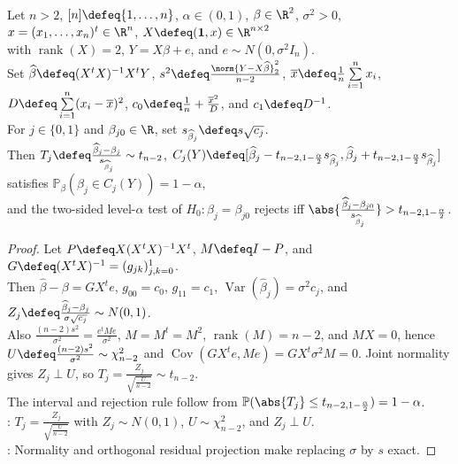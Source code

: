 \begin{corollary} \label{cor:simple-regression-t-intervals} \\
Let $n>2$, $[n]\defeq\{1,\ldots,n\}$, $\alpha\in(0,1)$, $\beta\in\R^2$, $\sigma^2>0$, $x=(x_1,\ldots,x_n)^t\in\R^n$, $X\defeq(\mathbf{1},x)\in\R^{n\times2}$\\
with $\operatorname{rank}(X)=2$, $Y=X\beta+e$, and $e\sim N(0,\sigma^2I_n)$.\\
Set $\widehat{\beta}\defeq(X^tX)^{-1}X^tY$, $s^2\defeq\frac{\norm{Y-X\widehat{\beta}}_2^2}{n-2}$, $\overline{x}\defeq \frac{1}{n}\sum\limits_{i=1}^{n}x_i$, $D\defeq\sum\limits_{i=1}^{n}(x_i-\overline{x})^2$, $c_0\defeq \frac{1}{n}+\frac{\overline{x}^2}{D}$, and $c_1\defeq D^{-1}$.\\
For $j\in\{0,1\}$ and $\beta_{j0}\in\R$, set $s_{\widehat{\beta}_j}\defeq s\sqrt{c_j}$.\\
Then $T_j\defeq\frac{\widehat{\beta}_j-\beta_j}{s_{\widehat{\beta}_j}}\sim t_{n-2}$, $C_j(Y)\defeq[\widehat{\beta}_j-t_{n-2,1-\frac{\alpha}{2}}s_{\widehat{\beta}_j},\widehat{\beta}_j+t_{n-2,1-\frac{\alpha}{2}}s_{\widehat{\beta}_j}]$ satisfies $\mathbb{P}_\beta(\beta_j\in C_j(Y))=1-\alpha$,\\
and the two-sided level-$\alpha$ test of $H_0:\beta_j=\beta_{j0}$ rejects iff $\abs{\frac{\widehat{\beta}_j-\beta_{j0}}{s_{\widehat{\beta}_j}}}>t_{n-2,1-\frac{\alpha}{2}}$.
\begin{proof} Let $P\defeq X(X^tX)^{-1}X^t$, $M\defeq I-P$, and $G\defeq(X^tX)^{-1}=(g_{jk})_{j,k=0}^{1}$.\\
Then $\widehat{\beta}-\beta=GX^te$, $g_{00}=c_0$, $g_{11}=c_1$, $\operatorname{Var}(\widehat{\beta}_j)=\sigma^2c_j$, and $Z_j\defeq\frac{\widehat{\beta}_j-\beta_j}{\sigma\sqrt{c_j}}\sim N(0,1)$.\\
Also $\frac{(n-2)s^2}{\sigma^2}=\frac{e^tMe}{\sigma^2}$, $M=M^t=M^2$, $\operatorname{rank}(M)=n-2$, and $MX=0$, hence $U\defeq\frac{(n-2)s^2}{\sigma^2}\sim\chi^2_{n-2}$ and $\operatorname{Cov}(GX^te,Me)=GX^t\sigma^2M=0$. Joint normality gives $Z_j\perp U$, so $T_j=\frac{Z_j}{\sqrt{\frac{U}{n-2}}}\sim t_{n-2}$.\\
The interval and rejection rule follow from $\mathbb{P}(\abs{T_j}\leq t_{n-2,1-\frac{\alpha}{2}})=1-\alpha$.\\
: $T_j=\frac{Z_j}{\sqrt{\frac{U}{n-2}}}$ with $Z_j\sim N(0,1)$, $U\sim\chi^2_{n-2}$, and $Z_j\perp U$.\\
: Normality and orthogonal residual projection make replacing $\sigma$ by $s$ exact.
\end{proof}
\end{corollary}

